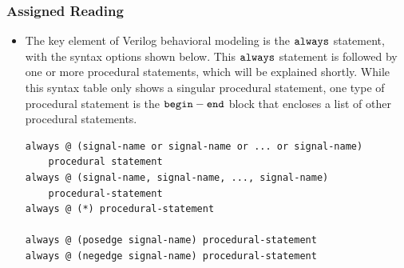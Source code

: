 \documentclass[10pt,a4paper]{article}
\begin{document}
\subsubsection{Assigned Reading}
\begin{itemize}
\item The key element of Verilog behavioral modeling is the $\tt{always}$ statement, with the syntax options shown below. This $\tt{always}$ statement is followed by one or more procedural statements, which will be explained shortly. While this syntax table only shows a singular procedural statement, one type of procedural statement is the $\tt{begin-end}$ block that encloses a list of other procedural statements.
\begin{lstlisting}
always @ (signal-name or signal-name or ... or signal-name)
	procedural statement
always @ (signal-name, signal-name, ..., signal-name)
	procedural-statement
always @ (*) procedural-statement

always @ (posedge signal-name) procedural-statement
always @ (negedge signal-name) procedural-statement


\end{lstlisting}
\end{itemize}
\end{document}
